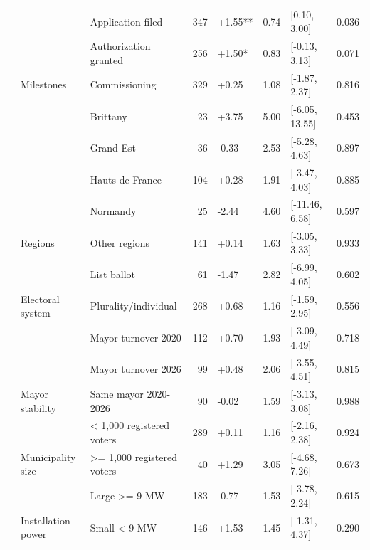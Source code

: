 \begin{ThreePartTable}
\begin{longtable}[t]{lllrllll}
\cmidrule{2-8}\nopagebreak
 &  & Application filed & 347 & +1.55** & 0.74 & {}[0.10, 3.00] & 0.036\\
\cmidrule{3-8}\nopagebreak
 &  & Authorization granted & 256 & +1.50* & 0.83 & {}[-0.13, 3.13] & 0.071\\
\cmidrule{3-8}\nopagebreak
 & \multirow[t]{-3}{*}{\raggedright\arraybackslash Milestones} & Commissioning & 329 & +0.25 & 1.08 & {}[-1.87, 2.37] & 0.816\\
\cmidrule{2-8}\nopagebreak
 &  & Brittany & 23 & +3.75 & 5.00 & {}[-6.05, 13.55] & 0.453\\
\cmidrule{3-8}\nopagebreak
 &  & Grand Est & 36 & -0.33 & 2.53 & {}[-5.28, 4.63] & 0.897\\
\cmidrule{3-8}\nopagebreak
 &  & Hauts-de-France & 104 & +0.28 & 1.91 & {}[-3.47, 4.03] & 0.885\\
\cmidrule{3-8}\nopagebreak
 &  & Normandy & 25 & -2.44 & 4.60 & {}[-11.46, 6.58] & 0.597\\
\cmidrule{3-8}\nopagebreak
 & \multirow[t]{-5}{*}{\raggedright\arraybackslash Regions} & Other regions & 141 & +0.14 & 1.63 & {}[-3.05, 3.33] & 0.933\\
\cmidrule{2-8}\nopagebreak
 &  & List ballot & 61 & -1.47 & 2.82 & {}[-6.99, 4.05] & 0.602\\
\cmidrule{3-8}\nopagebreak
 & \multirow[t]{-2}{*}{\raggedright\arraybackslash Electoral system} & Plurality/individual & 268 & +0.68 & 1.16 & {}[-1.59, 2.95] & 0.556\\
\cmidrule{2-8}\nopagebreak
 &  & Mayor turnover 2020 & 112 & +0.70 & 1.93 & {}[-3.09, 4.49] & 0.718\\
\cmidrule{3-8}\nopagebreak
 &  & Mayor turnover 2026 & 99 & +0.48 & 2.06 & {}[-3.55, 4.51] & 0.815\\
\cmidrule{3-8}\nopagebreak
 & \multirow[t]{-3}{*}{\raggedright\arraybackslash Mayor stability} & Same mayor 2020-2026 & 90 & -0.02 & 1.59 & {}[-3.13, 3.08] & 0.988\\
\cmidrule{2-8}\nopagebreak
 &  & < 1,000 registered voters & 289 & +0.11 & 1.16 & {}[-2.16, 2.38] & 0.924\\
\cmidrule{3-8}\nopagebreak
 & \multirow[t]{-2}{*}{\raggedright\arraybackslash Municipality size} & >= 1,000 registered voters & 40 & +1.29 & 3.05 & {}[-4.68, 7.26] & 0.673\\
\cmidrule{2-8}\nopagebreak
 &  & Large >= 9 MW & 183 & -0.77 & 1.53 & {}[-3.78, 2.24] & 0.615\\
\cmidrule{3-8}\nopagebreak
 & \multirow[t]{-2}{*}{\raggedright\arraybackslash Installation power} & Small < 9 MW & 146 & +1.53 & 1.45 & {}[-1.31, 4.37] & 0.290\\

\end{longtable}
\end{ThreePartTable}
